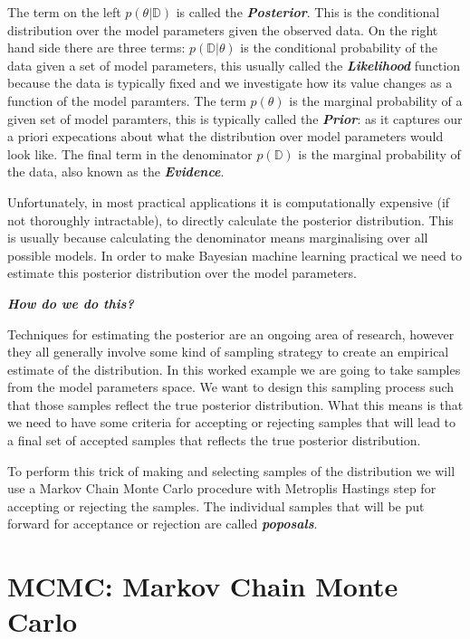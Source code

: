 \documentclass[12pt,a4paper]{article}
\numberwithin{equation}{section}
\begin{document}
The term on the left $p(\theta | \mathbb{D})$ is called the \textbf{\textit{Posterior}}. 
This is the conditional distribution over the model parameters given the observed data. 
On the right hand side there are three terms: $p(\mathbb{D} | \theta)$ is the 
conditional probability of the data given a set of 
model parameters, this usually called the \textbf{\textit{Likelihood}} function because the 
data is typically fixed and we investigate how its value changes as a function of the model paramters. 
The term $p(\theta)$ is the marginal probability of a given set of model paramters, this is typically
called the \textbf{\textit{Prior}}: as it captures our a priori expecations about what the distribution over model 
parameters would look like. The final term in the denominator $p(\mathbb{D})$ is the marginal probability
of the data, also known as the \textbf{\textit{Evidence}}.

Unfortunately, in most practical applications it is computationally expensive (if not thoroughly intractable),
to directly calculate the posterior distribution. This is usually because calculating 
the denominator means marginalising over all possible models. 
In order to make Bayesian machine learning practical we need to estimate this posterior distribution 
over the model parameters.

\textbf{\textit{How do we do this?}}

Techniques for estimating the posterior are an ongoing area of research, however they all generally involve
some kind of sampling strategy to create an empirical estimate of the distribution.
In this worked example we are going to take samples from the model parameters space. 
We want to design this sampling process such that
those samples reflect the true posterior distribution. What this means is that we need to have some criteria for
accepting or rejecting samples that will lead to a final set of accepted samples that reflects the true
posterior distribution.

To perform this trick of making and selecting samples of the distribution we will use a Markov Chain Monte Carlo 
procedure with Metroplis Hastings step for accepting or rejecting the samples. 
The individual samples that will be put forward for acceptance or rejection are called \textbf{\textit{poposals}}.


\section{MCMC: Markov Chain Monte Carlo}
\end{document}
